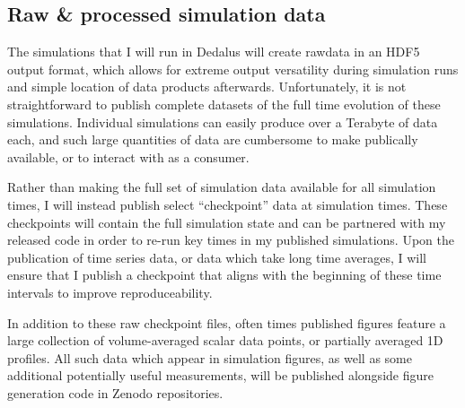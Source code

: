 \documentclass[11pt, preprint]{aastex}
\begin{document}
\subsection{Raw \& processed simulation data}
The simulations that I will run in Dedalus will create rawdata in an HDF5 output format, which allows for extreme output versatility during simulation runs and simple location of data products afterwards.
Unfortunately, it is not straightforward to publish complete datasets of the full time evolution of these simulations.
Individual simulations can easily produce over a Terabyte of data each, and such large quantities of data are cumbersome to make publically available, or to interact with as a consumer.

Rather than making the full set of simulation data available for all simulation times, I will instead publish select ``checkpoint'' data at simulation times.
These checkpoints will contain the full simulation state and can be partnered with my released code in order to re-run key times in my published simulations.
Upon the publication of time series data, or data which take long time averages, I will ensure that I publish a checkpoint that aligns with the beginning of these time intervals to improve reproduceability.

In addition to these raw checkpoint files, often times published figures feature a large collection of volume-averaged scalar data points, or partially averaged 1D profiles.
All such data which appear in simulation figures, as well as some additional potentially useful measurements, will be published alongside figure generation code in Zenodo repositories.



\end{document}
